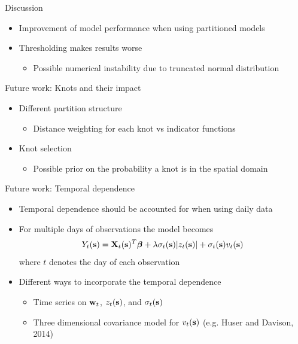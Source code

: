 \documentclass{beamer}
\begin{document}
\begin{frame}{Discussion}
  \begin{itemize} \setlength{\itemsep}{1em}
    \item Improvement of model performance when using partitioned models
    \item Thresholding makes results worse
    \begin{itemize}
      \item Possible numerical instability due to truncated normal distribution
    \end{itemize}
  \end{itemize}
\end{frame}

\begin{frame}{Future work: Knots and their impact}
  \begin{itemize} \setlength{\itemsep}{1em}
    \item Different partition structure
    \begin{itemize}
      \item Distance weighting for each knot vs indicator functions
    \end{itemize}
    \item Knot selection
    \begin{itemize}
      \item Possible prior on the probability a knot is in the spatial domain
    \end{itemize}
  \end{itemize}
\end{frame}

\begin{frame}{Future work: Temporal dependence}
  \begin{itemize} \setlength{\itemsep}{1em}
    \item Temporal dependence should be accounted for when using daily data
    \item For multiple days of observations the model becomes
      \begin{align*}
        Y_t(\mbox{\bf s}) = \mbox{\bf X}_t(\mbox{\bf s})^T \mbox{\boldmath $\beta$} + \lambda \sigma_t(\mbox{\bf s}) | z_t(\mbox{\bf s}) | + \sigma_t(\mbox{\bf s}) v_t(\mbox{\bf s})
      \end{align*}
      where $t$ denotes the day of each observation
    \item Different ways to incorporate the temporal dependence
    \begin{itemize}
      \item Time series on $\mbox{\bf w}_t$, $z_t(\mbox{\bf s})$, and $\sigma_t(\mbox{\bf s})$
      \item Three dimensional covariance model for $v_t(\mbox{\bf s})$ (e.g. Huser and Davison, 2014)
    \end{itemize}
  \end{itemize}
\end{frame}
\end{document}

